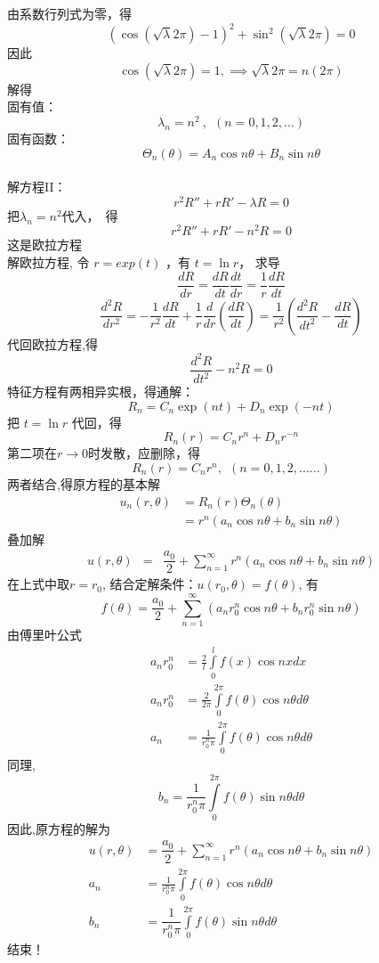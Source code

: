 	由系数行列式为零，得
	$$(\cos (\sqrt {\lambda} 2\pi )-1 ) ^2 + \sin ^2 (\sqrt {\lambda} 2\pi ) =0$$
	因此 
$$\cos (\sqrt {\lambda} 2\pi)=1, \implies \sqrt {\lambda} 2\pi = n(2\pi)$$  
	解得\\   	
	固有值：$$\lambda _n =n^2 ~,~~ (n=0,1,2,...)$$   
	固有函数：$$\displaystyle  \Theta_n (\theta)=A_n\cos n \theta +B_n \sin n \theta $$
~~\\ 
	解方程II：
	$$\displaystyle  r^2 R'' +r R' -\lambda R =0 $$  
	把$\lambda_n =n^2 $代入， 得 
	$$\displaystyle  r^2 R'' +r R' -n^2R =0 $$  
	这是欧拉方程\\ 
	解欧拉方程, 令 $ r=exp(t) $ ，有 $t=\ln r$， 求导 
	$$ \displaystyle \frac{dR}{dr} =\frac{dR}{dt} \frac{dt}{dr} =\frac{1}{r} \frac{dR}{dt} $$  
	$$ \displaystyle \frac{d^2R}{dr^2} =-\frac{1}{r^2}\frac{dR}{dt} + \frac{1}{r} \frac{d}{dr} (\frac{dR}{dt} )= \frac{1}{r^2} (\frac{d^2R}{dt^2}-\frac{dR}{dt} )$$ 
	代回欧拉方程,得
	$$ \displaystyle   \dfrac{d^2R}{dt^2} -n^2 R =0 $$ 
	特征方程有两相异实根，得通解： 
	$$ R_n=C_n\exp(nt)+D_n \exp(-nt) $$
	把 $t=\ln r$ 代回，得
	$$R_n(r)=C_n r^n +D_nr^{-n}$$ 
	第二项在$r\to 0$时发散，应删除，得
	$$R_n(r)= C_n r^n,  ~~ (n=0,1,2,......) $$
	两者结合,得原方程的基本解
	$$\begin{array}{llll}
		u_n(r,\theta) &= R_n(r) \Theta_n (\theta) \\
		&=  r^n(a_n \cos n\theta +b_n \sin n \theta )   
	\end{array}$$ 
	叠加解 
	$$\begin{array}{llll}
		u(r, \theta) &=& \dfrac{a_0}{2}  +\sum\limits_{n=1}^{\infty }r^n (a_n  \cos n\theta +b_n \sin n \theta ) 
	\end{array}$$ 
	在上式中取$r =r_0 $, 结合定解条件：$ u(r_0,\theta)=f (\theta) $, 有 
	$$ f (\theta) = \dfrac{a_0}{2}  +\sum\limits_{n=1}^{\infty } (a_n r_0^n\cos n\theta +b_n r_0^n \sin n \theta ) $$
	由傅里叶公式
	$$\begin{aligned}
		a_n r_0^n & = \frac{2}{l}\int\limits_{0}^{l} f(x) \cos n x dx \\ 
		a_n r_0^n & = \frac{2}{2\pi  } \int\limits_{0}^{2\pi} f(\theta) \cos n \theta d\theta \\
		a_n & = \frac{1}{r_0^n \pi  } \int\limits_{0}^{2\pi} f(\theta) \cos n \theta d\theta 
	\end{aligned}$$
	同理,
	$$  \displaystyle  b_n = \dfrac{1}{r_0 ^n \pi }  \int\limits_{0}^{2\pi} f(\theta) \sin n \theta d\theta $$ 
	因此,原方程的解为
	$$\boxed{\begin{aligned}
			u(r, \theta) &= \dfrac{a_0}{2}  +\sum\limits_{n=1}^{\infty }r^n (a_n  \cos n\theta +b_n \sin n \theta )\\ 
			a_n & = \frac{1}{r_0^n \pi  } \int\limits_{0}^{2\pi} f(\theta) \cos n \theta d\theta \\
			b_n &= \dfrac{1}{r_0 ^n \pi }  \int\limits_{0}^{2\pi} f(\theta) \sin n \theta d\theta
		\end{aligned}} $$
	结束！ 

